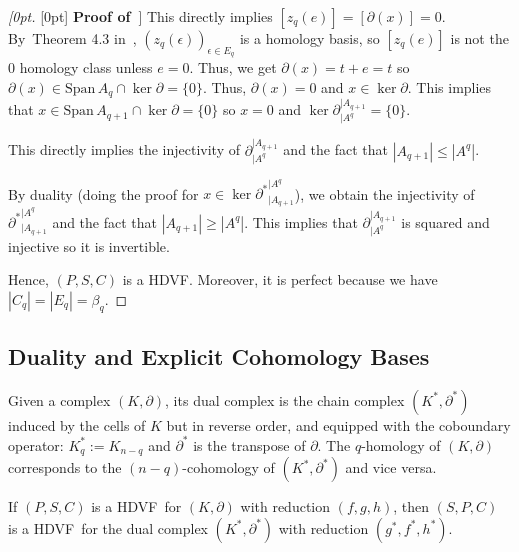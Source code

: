 \documentclass[runningheads]{llncs}
\let\Oldsubsection\subsection
\renewcommand{\subsection}{\FloatBarrier\Oldsubsection}
\newenvironment{delayedproof}[1]
 {\begin{proof}[\raisedtarget{#1}\textbf{Proof of~\Cref{#1}}]}
 {\end{proof}}
\newcommand{\raisedtarget}[1]{%
  \raisebox{\fontcharht\font`P}[0pt][0pt]{\hypertarget{#1}{}}%
}
\newcommand\Span{\mathrm{Span}\,}
\newcommand{\dr}{\partial}
\newcommand{\HC}{HDVF}
\begin{document}
\begin{delayedproof}{prop_hc-equiv-tri-partition}
    This directly implies $[z_q(e)] = [\dr(x)] = 0$.
    By~Theorem 4.3 in~\cite{edelsbrunner-tri_partition}, $(z_q(\epsilon))_{\epsilon\in E_q}$ is a homology basis, so $[z_q(e)]$ is not the 0 homology class unless $e = 0$.
    Thus, we get $\dr(x) = t+e = t$ so $\dr(x) \in \Span A_q \cap \ker\dr = \{0\}$.
    Thus, $\dr(x) = 0$ and $x\in\ker\dr$.
    This implies that $x\in \Span A_{q+1} \cap \ker\dr = \{0\}$ so $x=0$ and $\ker\dr_{|A^q}^{|A_{q+1}} = \{0\}$.
    
    This directly implies the injectivity of $\dr_{|A^q}^{|A_{q+1}}$ and the fact that $|A_{q+1}| \leq |A^{q}|$.

    \smallskip

    By duality (doing the proof for $x \in \ker {\dr^*}^{|A^q}_{|A_{q+1}}$), we obtain the injectivity of ${\dr^*}^{|A^q}_{|A_{q+1}}$ and the fact that $|A_{q+1}| \geq |A^{q}|$.
    This implies that $\dr_{|A^q}^{|A_{q+1}}$ is squared and injective so it is invertible.

    Hence, $(P,S,C)$ is a \HC.
    Moreover, it is perfect because we have $|C_q| = |E_q| = \beta_q$.
\end{delayedproof}

\subsection{Duality and Explicit Cohomology Bases}\label{sect:explicit-cohomology-bases}
    \begin{definition}\label{def:dual-complex}
        Given a complex $(K,\dr)$, its dual complex is the chain complex $(K^\ast, \dr^\ast)$ induced by the cells of $K$ but in reverse order, and equipped with the coboundary operator: $K^\ast_q := K_{n-q}$ and $\dr^\ast$ is the transpose of $\dr$.
        The $q$-homology of $(K,\dr)$ corresponds to the $(n-q)$-cohomology of $(K^\ast, \dr^\ast)$ and vice versa.
    \end{definition}

    \begin{proposition}\label{prop_hvdf-dual-reduction}
        If $(P,S,C)$ is a \HC\ for $(K,\dr)$ with reduction $(f,g,h)$, then $(S,P,C)$ is a \HC\ for the dual complex $(K^\ast, \dr^\ast)$ with reduction $(g^\ast,f^\ast,h^\ast)$.
    \end{proposition}
\end{document}
